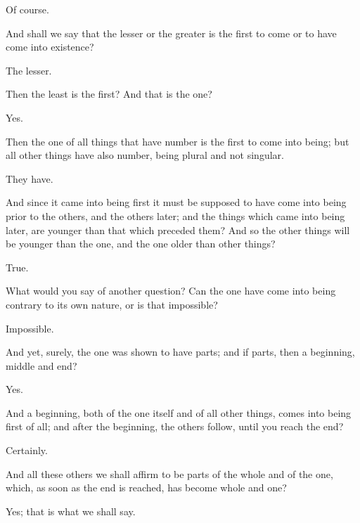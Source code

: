 \documentclass[11pt,letter]{article}
\begin{document}
\par  Of course.

\par  And shall we say that the lesser or the greater is the first to come or to have come into existence?

\par  The lesser.

\par  Then the least is the first? And that is the one?

\par  Yes.

\par  Then the one of all things that have number is the first to come into being; but all other things have also number, being plural and not singular.

\par  They have.

\par  And since it came into being first it must be supposed to have come into being prior to the others, and the others later; and the things which came into being later, are younger than that which preceded them? And so the other things will be younger than the one, and the one older than other things?

\par  True.

\par  What would you say of another question? Can the one have come into being contrary to its own nature, or is that impossible?

\par  Impossible.

\par  And yet, surely, the one was shown to have parts; and if parts, then a beginning, middle and end?

\par  Yes.

\par  And a beginning, both of the one itself and of all other things, comes into being first of all; and after the beginning, the others follow, until you reach the end?

\par  Certainly.

\par  And all these others we shall affirm to be parts of the whole and of the one, which, as soon as the end is reached, has become whole and one?

\par  Yes; that is what we shall say.
\end{document}
